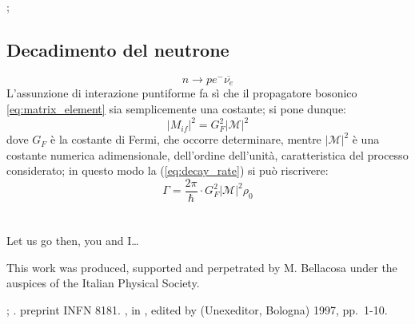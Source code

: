 \documentclass{subnucbo}
\begin{document}
;

\subsection{Decadimento del neutrone}
\begin{equation}
        n \rightarrow p e^{-} \overline{\nu_{e}}
        \label{eq:neutro_decay}
\end{equation}
L'assunzione di interazione puntiforme fa sì che il propagatore bosonico \ref{eq:matrix_element} sia semplicemente una costante; si pone dunque:
\begin{equation}
        |M_{if}|^{2} = G_{F}^{2}|\mathcal{M}|^{2}
        \label{eq:mat_element_fermi_const}
\end{equation}
dove $G_{F}$ è la costante di Fermi, che occorre determinare, mentre $|\mathcal{M}|^{2}$ è una costante numerica adimensionale, dell'ordine dell'unità, caratteristica del processo considerato; in questo modo la (\ref{eq:decay_rate}) si può riscrivere:
\begin{equation}
        \Gamma = \frac{2 \pi} {\hbar} \cdot G_{F}^{2}|\mathcal{M}|^{2} \rho_{0}
        \label{eq:decay_rate_neutron}
\end{equation}


\appendix

\section{}
Let us go then, you and I\ldots

\acknowledgments
This work was produced, supported and perpetrated by M. Bellacosa under
the auspices of the Italian Physical Society.

\begin{thebibliography}{0}
 
  ;
  .
 
  preprint INFN 8181.
 
  ,
  in ,
                  edited by 
                  (Unexeditor, Bologna) 1997, pp.~1-10.
\end{thebibliography}
\end{document}
